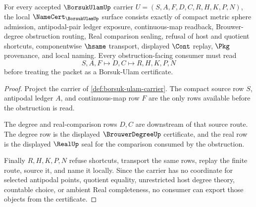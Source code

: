 \begin{theorem}
\label{thm:borsuk-ulam-namecert-obligations}
For every accepted $\BorsukUlamUp$ carrier $U=(S,A,F,D,C,R,H,K,P,N)$, the local $\NameCert_{\BorsukUlamUp}$ surface consists exactly of compact metric sphere admission, antipodal-pair ledger exposure, continuous-map readback, Brouwer-degree obstruction routing, Real comparison sealing, refusal of host and quotient shortcuts, componentwise $\hsame$ transport, displayed $\Cont$ replay, $\Pkg$ provenance, and local naming. Every obstruction-facing consumer must read
$$
S,A,F \longmapsto D,C \longmapsto R,H,K,P,N
$$
before treating the packet as a Borsuk-Ulam certificate.
\end{theorem}
\begin{proof}
Project the carrier of \autoref{def:borsuk-ulam-carrier}. The compact source row $S$, antipodal ledger $A$, and continuous-map row $F$ are the only rows available before the obstruction is read.

The degree and real-comparison rows $D,C$ are downstream of that source route. The degree row is the displayed $\BrouwerDegreeUp$ certificate, and the real row is the displayed $\RealUp$ seal for the comparison consumed by the obstruction.

Finally $R,H,K,P,N$ refuse shortcuts, transport the same rows, replay the finite route, source it, and name it locally. Since the carrier has no coordinate for selected antipodal points, quotient equality, unrestricted host degree theory, countable choice, or ambient Real completeness, no consumer can export those objects from the certificate.
\end{proof}

